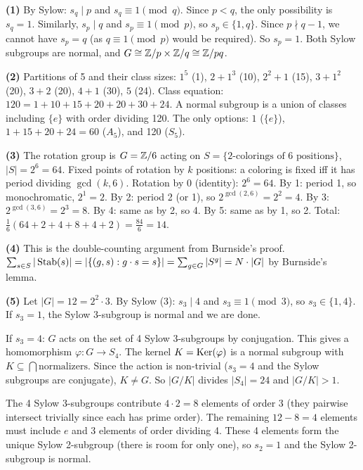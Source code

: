 \documentclass{report}
\begin{document}
\begin{solution}
\textbf{(1)} By Sylow: \(s_q \mid p\) and \(s_q \equiv 1 \pmod{q}\). Since \(p < q\), the only possibility is \(s_q = 1\). Similarly, \(s_p \mid q\) and \(s_p \equiv 1 \pmod{p}\), so \(s_p \in \{1, q\}\). Since \(p \nmid q - 1\), we cannot have \(s_p = q\) (as \(q \equiv 1 \pmod{p}\) would be required). So \(s_p = 1\). Both Sylow subgroups are normal, and \(G \cong \ZZ/p \times \ZZ/q \cong \ZZ/pq\).

\textbf{(2)} Partitions of 5 and their class sizes: \(1^5\) (1), \(2+1^3\) (10), \(2^2+1\) (15), \(3+1^2\) (20), \(3+2\) (20), \(4+1\) (30), \(5\) (24). Class equation: \(120 = 1 + 10 + 15 + 20 + 20 + 30 + 24\). A normal subgroup is a union of classes including \(\{e\}\) with order dividing 120. The only options: \(1\) (\(\{e\}\)), \(1 + 15 + 20 + 24 = 60\) (\(A_5\)), and 120 (\(S_5\)).

\textbf{(3)} The rotation group is \(G = \ZZ/6\) acting on \(S = \{2\text{-colorings of 6 positions}\}\), \(|S| = 2^6 = 64\). Fixed points of rotation by \(k\) positions: a coloring is fixed iff it has period dividing \(\gcd(k, 6)\). Rotation by 0 (identity): \(2^6 = 64\). By 1: period 1, so monochromatic, \(2^1 = 2\). By 2: period 2 (or 1), so \(2^{\gcd(2,6)} = 2^2 = 4\). By 3: \(2^{\gcd(3,6)} = 2^3 = 8\). By 4: same as by 2, so 4. By 5: same as by 1, so 2. Total: \(\frac{1}{6}(64 + 2 + 4 + 8 + 4 + 2) = \frac{84}{6} = 14\).

\textbf{(4)} This is the double-counting argument from Burnside's proof. \(\sum_{s \in S} |\operatorname{Stab}(s)| = |\{(g,s) : g \cdot s = s\}| = \sum_{g \in G} |S^g| = N \cdot |G|\) by Burnside's lemma.

\textbf{(5)} Let \(|G| = 12 = 2^2 \cdot 3\). By Sylow (3): \(s_3 \mid 4\) and \(s_3 \equiv 1 \pmod{3}\), so \(s_3 \in \{1, 4\}\). If \(s_3 = 1\), the Sylow 3-subgroup is normal and we are done.

If \(s_3 = 4\): \(G\) acts on the set of 4 Sylow 3-subgroups by conjugation. This gives a homomorphism \(\varphi : G \to S_4\). The kernel \(K = \operatorname{Ker}(\varphi)\) is a normal subgroup with \(K \subseteq \bigcap \text{normalizers}\). Since the action is non-trivial (\(s_3 = 4\) and the Sylow subgroups are conjugate), \(K \neq G\). So \(|G/K|\) divides \(|S_4| = 24\) and \(|G/K| > 1\).

The 4 Sylow 3-subgroups contribute \(4 \cdot 2 = 8\) elements of order 3 (they pairwise intersect trivially since each has prime order). The remaining \(12 - 8 = 4\) elements must include \(e\) and 3 elements of order dividing 4. These 4 elements form the unique Sylow 2-subgroup (there is room for only one), so \(s_2 = 1\) and the Sylow 2-subgroup is normal.
\end{solution}
\end{document}
